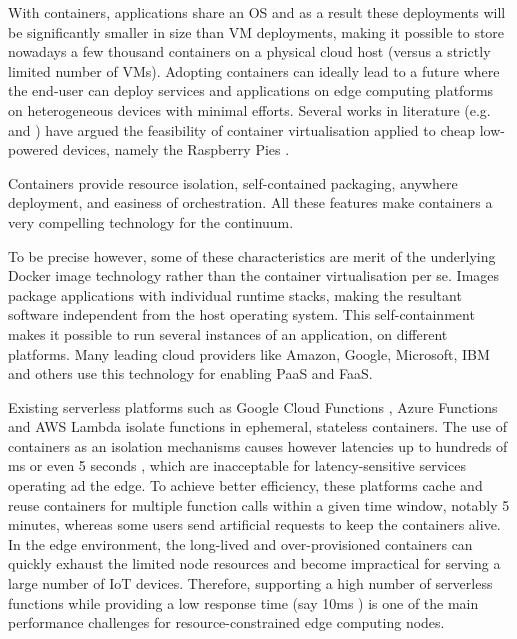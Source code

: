 With containers, applications share an OS and as a result these deployments will be significantly smaller in size than VM deployments, making it possible to store nowadays a few thousand containers on a physical cloud host (versus a strictly limited number of VMs). Adopting containers can ideally lead to a future where the end-user can deploy services and applications on edge computing platforms on heterogeneous devices with minimal efforts. Several works in literature (e.g. \cite{containers-raspberry} and \cite{containers-fog}) have argued the feasibility of container virtualisation applied to cheap low-powered devices, namely the Raspberry Pies \cite{raspberry}.

Containers provide resource isolation, self-contained packaging, anywhere deployment, and easiness of orchestration. All these features make containers a very compelling technology for the continuum.

To be precise however, some of these characteristics are merit of the underlying Docker image technology \cite{docker-image} rather than the container virtualisation per se. Images package applications with individual runtime stacks, making the resultant software independent from the host operating system. This self-containment makes it possible to run several instances of an application, on different platforms. Many leading cloud providers like Amazon, Google, Microsoft, IBM and others use this technology for enabling PaaS and FaaS.

Existing serverless platforms such as Google Cloud Functions \cite{gcloud-functions}, Azure Functions \cite{azure-functions} and AWS Lambda \cite{aws-lambda} isolate functions in ephemeral, stateless containers. The use of containers as an isolation mechanisms causes however latencies up to hundreds of ms or even 5 seconds \cite{serverless-evaluation}, which are inacceptable for latency-sensitive services operating ad the edge. To achieve better efficiency, these platforms cache and reuse containers for multiple function calls within a given time window, notably 5 minutes, whereas some users send artificial requests to keep the containers alive. In the edge environment, the long-lived and over-provisioned containers can quickly exhaust the limited node resources and become impractical for serving a large number of IoT devices. Therefore, supporting a high number of serverless functions while providing a low response time (say 10ms \cite{urllc}) is one of the main performance challenges for resource-constrained edge computing nodes.

